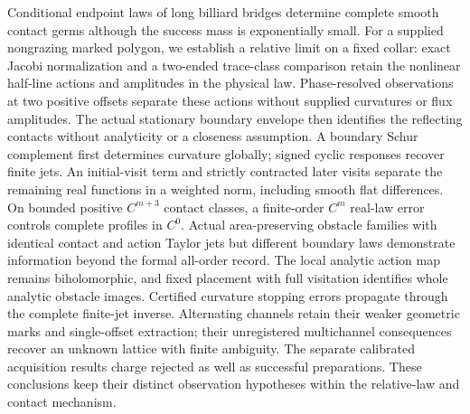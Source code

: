 Conditional endpoint laws of long billiard bridges determine complete
smooth contact germs although the success mass is exponentially small.
For a supplied nongrazing marked polygon, we establish a relative limit
on a fixed collar: exact Jacobi normalization and a two-ended trace-class
comparison retain the nonlinear half-line actions and amplitudes in the
physical law.  Phase-resolved observations at two positive offsets
separate these actions without supplied curvatures or flux amplitudes.
The actual stationary boundary envelope then identifies the reflecting
contacts without analyticity or a closeness assumption.  A boundary
Schur complement first determines curvature globally; signed cyclic
responses recover finite jets.  An initial-visit term and strictly
contracted later visits separate the remaining real functions in a
weighted norm, including smooth flat differences.  On bounded positive
$C^{m+3}$ contact classes, a finite-order $C^m$ real-law error controls
complete profiles in $C^0$.  Actual area-preserving obstacle families
with identical contact and action Taylor jets but different boundary
laws demonstrate information beyond the formal all-order record.
The local analytic action map remains biholomorphic, and fixed placement
with full visitation identifies whole analytic obstacle images.
Certified curvature stopping errors propagate through the complete
finite-jet inverse.  Alternating channels retain their weaker geometric
marks and single-offset extraction; their unregistered multichannel
consequences recover an unknown lattice with finite ambiguity.  The
separate calibrated acquisition results charge rejected as well as
successful preparations.  These conclusions keep their distinct
observation hypotheses within the relative-law and contact mechanism.
